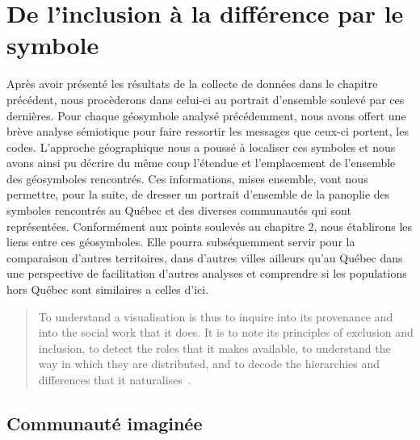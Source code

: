 \chapter{De l'inclusion à la différence par le symbole}
\label{cha:de_l_inclusion_la_diff_rence_par_le_symbole}

Après avoir présenté les résultats de la collecte de données dans le chapitre précédent, nous procèderons dans celui-ci au portrait d'ensemble soulevé par ces dernières.
Pour chaque géosymbole analysé précédemment, nous avons offert une brève analyse sémiotique pour faire ressortir les messages que ceux-ci portent, les codes.
L'approche géographique nous a poussé à localiser ces symboles et nous avons ainsi pu décrire du même coup l'étendue et l'emplacement de l'ensemble
des géosymboles rencontrés.
Ces informations, mises ensemble, vont nous permettre, pour la suite, de dresser un portrait d'ensemble de la panoplie des symboles rencontrés au Québec et des diverses communautés qui sont représentées.
Conformément aux points soulevés au chapitre 2, nous établirons les liens entre ces géosymboles.
Elle pourra subséquemment servir pour la comparaison d'autres territoires, dans d'autres villes ailleurs qu'au Québec dans une perspective de facilitation d'autres analyses et comprendre si les populations \lgbt{} hors Québec sont similaires a celles d'ici.

\begin{quote}
  To understand a visualisation is thus to inquire into its provenance and into the social work that it does.
  It is to note its principles of exclusion and inclusion, to detect the roles that it makes available, to understand the way in which they are distributed, and to decode the hierarchies and differences that it naturalises~\citep[1]{Fyfe1988}.
\end{quote}

\section{Communauté imaginée}
\label{sub:communaut_imagin_e}

